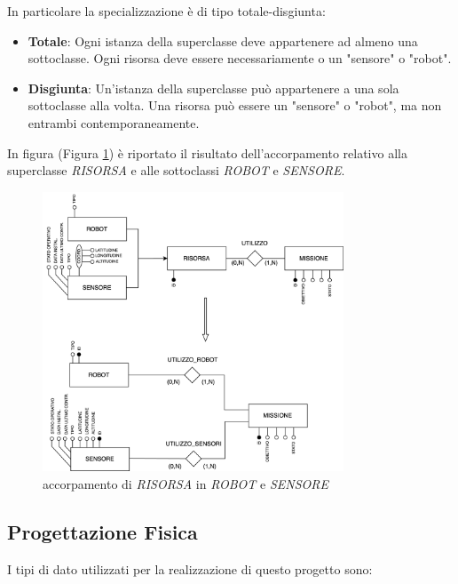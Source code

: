 \noindent
In particolare la specializzazione è di tipo totale-disgiunta:
\begin{itemize}
    \item \textbf{Totale}: Ogni istanza della superclasse deve appartenere ad almeno una sottoclasse. Ogni risorsa deve essere necessariamente o un "sensore" o "robot".
    \item \textbf{Disgiunta}: Un'istanza della superclasse può appartenere a una sola sottoclasse alla volta. Una risorsa può essere un "sensore" o "robot", ma non entrambi contemporaneamente.
\end{itemize}

\noindent
In figura (Figura \ref{fig:specializzazione}) è riportato il risultato dell'accorpamento relativo alla superclasse \textit{RISORSA} e alle sottoclassi \textit{ROBOT} e \textit{SENSORE}.

\begin{figure}[h!]
    \centering
    \includegraphics[width=0.8\textwidth]{Media/Generalizzazione_Specializzazione.png}
    \caption{accorpamento di \textit{RISORSA} in \textit{ROBOT} e \textit{SENSORE}}
    \label{fig:specializzazione}
\end{figure}

\subsection{Progettazione Fisica}

I tipi di dato utilizzati per la realizzazione di questo progetto sono:

